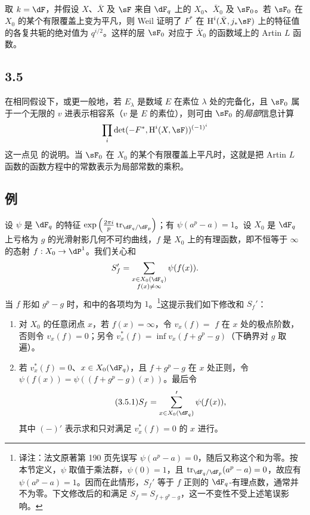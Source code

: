 \subsection{}\label{VI:3-4}

取 $k=\dF$，并假设 $X$、$\bar X$ 及 $\sF$ 来自 $\dF_q$ 上的 $X_0$、$\bar X_0$ 及 $\sF_0$。若 $\sF_0$ 在 $X_0$ 的某个有限覆盖上变为平凡，则 Weil 证明了 $F^\ast$ 在 $\h^i(\bar X,j_\ast\sF)$ 上的特征值的各复共轭的绝对值为 $q^{i/2}$。这样的层 $\sF_0$ 对应于 $\bar X_0$ 的函数域上的 Artin $L$ 函数。

\subsection*{3.5}\label{VI:3-5_} %

在相同假设下，或更一般地，若 $E_\lambda$ 是数域 $E$ 在素位 $\lambda$ 处的完备化，且 $\sF_0$ 属于一个无限的 $v$ 进表示相容系（$v$ 是 $E$ 的素位），则可由 $\sF_0$ 的\emph{局部}信息计算
\[
  \prod_i \det(-F^\ast,\h^i(X,\sF))^{(-1)^i}
\]
这一点见 \cite{de73} 的说明。当 $\sF_0$ 在 $X_0$ 的某个有限覆盖上平凡时，这就是把 Artin $L$ 函数的函数方程中的常数表示为局部常数的乘积。

\subsection{例}\label{VI:3-5}

设 $\psi$ 是 $\dF_q$ 的特征 $\exp\left(\frac{2\pi i}{p} \tr_{\dF_q/\dF_p}\right)$；有 $\psi(a^p-a)=1$。设 $X_0$ 是 $\dF_q$ 上亏格为 $g$ 的光滑射影几何不可约曲线，$f$ 是 $X_0$ 上的有理函数，即不恒等于 $\infty$ 的态射 $f:X_0 \to \dP^1$。我们关心和
\[
  S_f' = \sum_{\substack{x\in X_0(\dF_q) \\ f(x)\ne \infty}} \psi(f(x))
  \text{.}
\]
当 $f$ 形如 $g^p-g$ 时，和中的各项均为 $1$。\footnote{译注：法文原著第 190 页先误写 $\psi(a^p-a)=0$，随后又称这个和为零。按本节定义，$\psi$ 取值于乘法群，$\psi(0)=1$，且 $\tr_{\dF_q/\dF_p}(a^p-a)=0$，故应有 $\psi(a^p-a)=1$。因而在此情形，$S_f'$ 等于 $f$ 正则的 $\dF_q$-有理点数，通常并不为零。下文修改后的和满足 $S_f=S_{f+g^p-g}$，这一不变性不受上述笔误影响。}这提示我们如下修改和 $S_f'$：
\begin{enumerate}[\indent a)]
  \item 对 $X_0$ 的任意闭点 $x$，若 $f(x)=\infty$，令 $v_x(f) = $ $f$ 在 $x$ 处的极点阶数，否则令 $v_x(f)=0$；另令 $v_x^\ast(f) = \inf v_x(f+g^p-g)$（下确界对 $g$ 取遍）。
  \item 若 $v_x^\ast(f)=0$、$x\in X_0(\dF_q)$，且 $f+g^p-g$ 在 $x$ 处正则，令 $\psi(f(x)) = \psi((f+g^p-g)(x))$。最后令
    \begin{equation*}\tag{3.5.1}\label{VI:eq:3-5-1}
      S_f = \sum'_{x\in X_0(\dF_q)} \psi(f(x)) \text{,}
    \end{equation*}
    其中 $(-)'$ 表示求和只对满足 $v_x^\ast(f)=0$ 的 $x$ 进行。
\end{enumerate}

